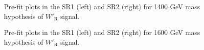 \begin{figure}[H]
  \centering
  \caption{Pre-fit plots in the SR1 (left) and SR2 (right) for 1400 GeV mass hypothesis of $W'_{\text{R}}$ signal.}
  \label{fig:Prefit_WpRH1400_Asimov}
\end{figure}
\begin{figure}[H]
  \centering
  \caption{Pre-fit plots in the SR1 (left) and SR2 (right) for 1600 GeV mass hypothesis of $W'_{\text{R}}$ signal.}
  \label{fig:Prefit_WpRH1600_Asimov}
\end{figure}
